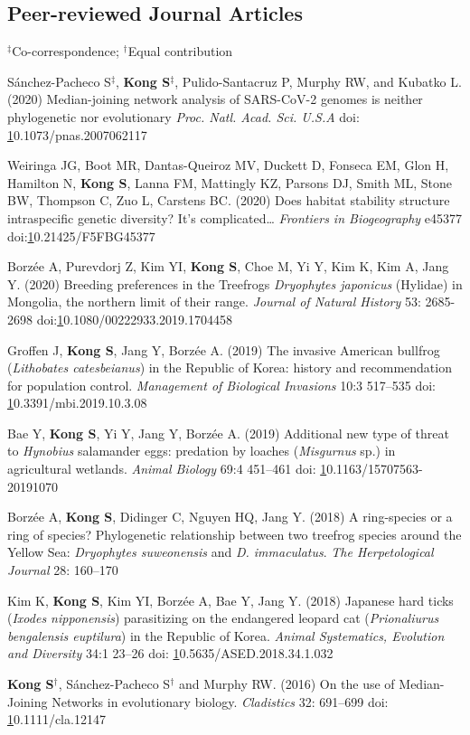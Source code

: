 \documentclass[11pt]{article}
\begin{document}
\subsection*{Peer-reviewed Journal Articles}
$^\ddag$Co-correspondence; $^\dag$Equal contribution
\begin{etaremune}

\item  Sánchez-Pacheco S{$^\ddag$}, \textbf{Kong S}{$^\ddag$}, Pulido-Santacruz P, Murphy RW, and Kubatko L. (2020) Median-joining network analysis of SARS-CoV-2 genomes is neither phylogenetic nor evolutionary \textit{Proc. Natl. Acad. Sci. U.S.A} doi: \href{https://doi.org/10.1073/pnas.2007062117}10.1073/pnas.2007062117
\item Weiringa JG, Boot MR,  Dantas-Queiroz MV, Duckett D, Fonseca EM, Glon H, Hamilton N, \textbf{Kong S}, Lanna FM, Mattingly KZ, Parsons DJ, Smith ML, Stone BW, Thompson C, Zuo L, Carstens BC. (2020) Does habitat stability structure intraspecific genetic diversity? It’s complicated… \textit{Frontiers in Biogeography} e45377 doi:\href{https://doi.org/10.21425/F5FBG45377}10.21425/F5FBG45377
\item Borzée A, Purevdorj Z, Kim YI, \textbf{Kong S}, Choe M, Yi Y, Kim K, Kim A, Jang Y. (2020) Breeding preferences in the Treefrogs \textit{Dryophytes japonicus} (Hylidae) in Mongolia, the northern limit of their range. \textit{Journal of Natural History} 53: 2685-2698 doi:\href{10.1080/00222933.2019.1704458}10.1080/00222933.2019.1704458
\item Groffen J, \textbf{Kong S}, Jang Y, Borzée A. (2019) The invasive American bullfrog (\textit{Lithobates catesbeianus}) in the Republic of Korea: history and recommendation for population control. \textit{Management of Biological Invasions} 10:3 517–535 doi: \href{10.3391/mbi.2019.10.3.08}10.3391/mbi.2019.10.3.08
\item Bae Y, \textbf{Kong S}, Yi Y, Jang Y, Borzée A. (2019) Additional new type of threat to \textit{Hynobius} salamander eggs: predation by loaches (\textit{Misgurnus} sp.) in agricultural wetlands. \textit{Animal Biology} 69:4 451–461 doi: \href{https://doi.org/10.1163/15707563-20191070}10.1163/15707563-20191070
\item Borzée A,\textbf{ Kong S}, Didinger C, Nguyen HQ, Jang Y. (2018) A ring-species or a ring of species? Phylogenetic relationship between two treefrog species around the Yellow Sea: \textit{Dryophytes suweonensis }and \textit{D. immaculatus}. \textit{The Herpetological Journal} 28: 160–170 
\item Kim K, \textbf{Kong S}, Kim YI, Borzée A, Bae Y, Jang Y. (2018) Japanese hard ticks (\textit{Ixodes nipponensis}) parasitizing on the endangered leopard cat (\textit{Prionaliurus bengalensis euptilura}) in the Republic of Korea. \textit{Animal Systematics, Evolution and Diversity} 34:1 23–26 doi: \href{10.5635/ASED.2018.34.1.032}10.5635/ASED.2018.34.1.032
\item \textbf{Kong S}{$^\dag$}, Sánchez-Pacheco S{$^\dag$} and Murphy RW. (2016) On the use of Median-Joining Networks in evolutionary biology. \textit{Cladistics} 32: 691–699 doi: \href{https://doi.org/10.1111/cla.12147}10.1111/cla.12147


\end{etaremune}
\end{document}
